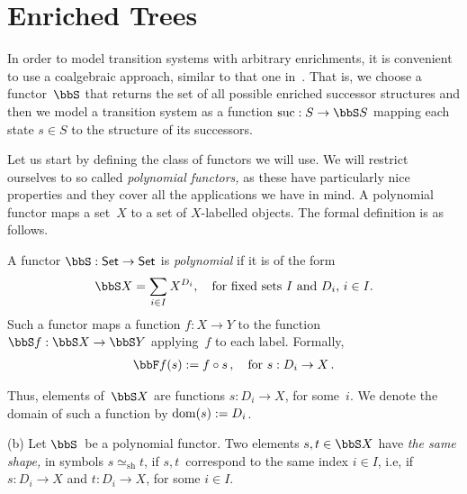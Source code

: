 \documentclass[10pt, fleqn]{scrartcl}
\DeclareRobustCommand*{\dom}{\qopname\relax o{dom}}
\newcommand*{\Set}{\mathsf{Set}}
\newcommand*{\sh}{\mathrm{sh}}
\newcommand*{\suc}{\mathrm{suc}}
\newcommand*{\?}{\kern .08em}
\begin{document}
\section{Enriched Trees}   %
\label{Sect: transition systems}


In order to model transition systems with arbitrary enrichments, it is convenient
to use a coalgebraic approach, similar to that one in~\cite{Venema06}.
That is, we choose a functor~$\bbS$ that returns
the set of all possible enriched successor structures and then we model a transition
system as a function $\suc : S \to \bbS S$ mapping each state $s \in S$ to the
structure of its successors.

Let us start by defining the class of functors we will use.
We will restrict ourselves to so called \emph{polynomial functors,} as these have particularly
nice properties and they cover all the applications we have in mind.
A polynomial functor maps a set~$X$ to a set of $X$-labelled objects.
The formal definition is as follows.
\begin{Def}
A functor $\bbS : \Set \to \Set$ is \emph{polynomial} if it is of the form
\begin{align*}
  \bbS X = \sum_{i \in I} X^{D_i},
  \quad\text{for fixed sets~$I$ and $D_i$, $i \in I$.}
\end{align*}
Such a functor maps a function $f : X \to Y$ to the function $\bbS f : \bbS X \to \bbS Y$
applying~$f$ to each label. Formally,
\begin{align*}
  \bbF f(s) := f \circ s\,, \quad\text{for } s : D_i \to X\,.
\end{align*}

Thus, elements of~$\bbS X$ are functions $s : D_i \to X$, for some~$i$.
We denote the domain of such a function by $\dom(s) := D_i$.

(b) Let $\bbS$~be a polynomial functor. Two elements $s,t \in \bbS X$ have
\emph{the same shape,} in symbols $s \simeq_\sh t$,
if $s,t$~correspond to the same index $i \in I$, i.e, if $s : D_i \to X$
and $t : D_i \to X$, for some $i \in I$.
\end{Def}
\end{document}
